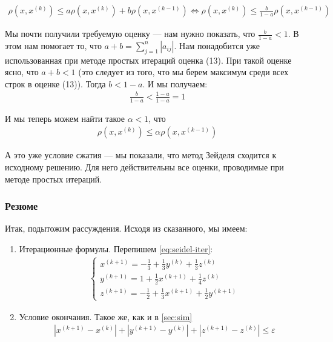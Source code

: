 \begin{align}
  \rho(x, x^{(k)}) \leq a \rho(x, x^{(k)}) + b \rho(x, x^{(k-1)}) \Leftrightarrow \rho(x, x^{(k)}) \leq \frac{b}{1 - a} \rho(x, x^{(k - 1)})
\end{align}

Мы почти получили требуемую оценку --- нам нужно показать, что \(\frac{b}{1 - a} < 1 \). В этом нам помогает то, что \(a + b = \sum\limits_{j=1}^n |a_{ij}|\). Нам понадобится уже использованная при методе простых итераций оценка (13). При такой оценке ясно, что \(a + b < 1\) (это следует из того, что мы берем максимум среди всех строк в оценке (13)). Тогда \(b < 1 - a\). И мы получаем:
\begin{align}
  \frac{b}{1 - a} < \frac{1 - a}{1 - a} = 1
\end{align}

И мы теперь можем найти такое \(\alpha < 1\), что 
\begin{align*}
  \rho(x, x^{(k)}) \leq \alpha \rho(x, x^{(k - 1)})
\end{align*}

А это уже условие сжатия --- мы показали, что метод Зейделя сходится к исходному решению. Для него действительны все оценки, проводимые при методе простых итераций.

\subsubsection*{Резюме}
Итак, подытожим рассуждения. Исходя из сказанного, мы имеем:
\begin{enumerate}
  \item Итерационные формулы. Перепишем \eqref{eq:seidel-iter}:
\begin{align}
  \begin{cases}
    x^{(k+1)} = -\frac{1}{3} + \frac{1}{3} y^{(k)} + \frac{1}{3} z^{(k)} \\
    y^{(k+1)} = 1 + \frac{1}{2} x^{(k+1)} + \frac{1}{4} z^{(k)} \\
    z^{(k+1)} = -\frac{1}{2} + \frac{1}{3} x^{(k+1)} + \frac{1}{2} y^{(k+1)} 
  \end{cases} 
\end{align}
  \item Условие окончания. Такое же, как и в \ref{sec:sim}
  \begin{align}
    |x^{(k + 1)} - x^{(k)}| + |y^{(k + 1)} - y^{(k)}| + |z^{(k + 1)} - z^{(k)}| \leq \varepsilon
  \end{align}
\end{enumerate}
